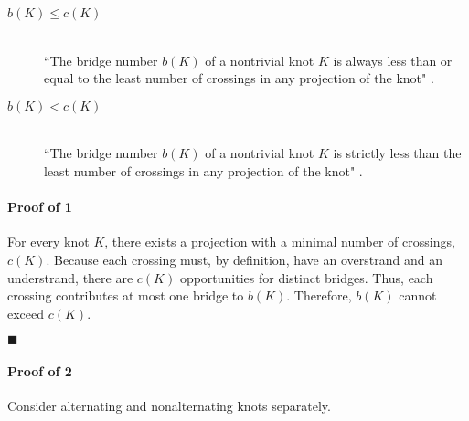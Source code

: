 \documentclass[titlepage]{article}
\newcommand{\dq}[4][]{``#2"#1 \cite[#4]{#3}.}
\newcommand{\qed}{
    \begin{flushright}
        $\blacksquare$
    \end{flushright}
}
\begin{document}
\begin{theor}
    \begin{description}
        \item[$b(K)\leq c(K)$] \hfill \\ \dq{The bridge number $b(K)$ of a nontrivial knot $K$ is always less than or equal to the least number of crossings in any projection of the knot}{bib:knotbook}{65}
        \item[$b(K)<c(K)$] \hfill \\ \dq{The bridge number $b(K)$ of a nontrivial knot $K$ is strictly less than the least number of crossings in any projection of the knot}{bib:knotbook}{65}
    \end{description}
\end{theor}

\paragraph{\textbf{Proof of 1}} For every knot $K$, there exists a projection with a minimal number of crossings, $c(K)$. Because each crossing must, by definition, have an overstrand and an understrand, there are $c(K)$ opportunities for distinct bridges. Thus, each crossing contributes at most one bridge to $b(K)$. Therefore, $b(K)$ cannot exceed $c(K)$.
\qed
\paragraph{\textbf{Proof of 2}} Consider alternating and nonalternating knots separately.
\end{document}
